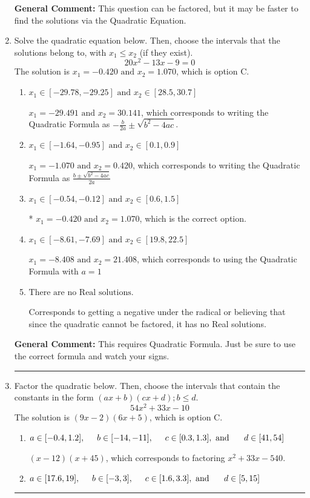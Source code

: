 \documentclass{extbook}[14pt]
\newcommand{\litem}[1]{\item #1

\rule{\textwidth}{0.4pt}}
\begin{document}
\begin{enumerate}
{\textbf{General Comment:} This question can be factored, but it may be faster to find the solutions via the Quadratic Equation.
}
\litem{
Solve the quadratic equation below. Then, choose the intervals that the solutions belong to, with $x_1 \leq x_2$ (if they exist).
\[ 20x^{2} -13 x -9 = 0 \]The solution is \( x_1 = -0.420 \text{ and } x_2 = 1.070 \), which is option C.\begin{enumerate}[label=\Alph*.]
\item \( x_1 \in [-29.78, -29.25] \text{ and } x_2 \in [28.5, 30.7] \)

 $x_1 = -29.491 \text{ and } x_2 = 30.141$, which corresponds to writing the Quadratic Formula as $-\frac{b}{2a} \pm \sqrt{b^2 - 4ac}$.
\item \( x_1 \in [-1.64, -0.95] \text{ and } x_2 \in [0.1, 0.9] \)

 $x_1 = -1.070 \text{ and } x_2 = 0.420$, which corresponds to writing the Quadratic Formula as $\frac{b \pm \sqrt{b^2 - 4ac}}{2a}$
\item \( x_1 \in [-0.54, -0.12] \text{ and } x_2 \in [0.6, 1.5] \)

* $x_1 = -0.420 \text{ and } x_2 = 1.070$, which is the correct option.
\item \( x_1 \in [-8.61, -7.69] \text{ and } x_2 \in [19.8, 22.5] \)

 $x_1 = -8.408 \text{ and } x_2 = 21.408$, which corresponds to using the Quadratic Formula with $a=1$
\item \( \text{There are no Real solutions.} \)

Corresponds to getting a negative under the radical or believing that since the quadratic cannot be factored, it has no Real solutions.
\end{enumerate}

\textbf{General Comment:} This requires Quadratic Formula. Just be sure to use the correct formula and watch your signs.
}
\litem{
Factor the quadratic below. Then, choose the intervals that contain the constants in the form $(ax+b)(cx+d); b \leq d.$
\[ 54x^{2} +33 x -10 \]The solution is \( (9x -2)(6x + 5) \), which is option C.\begin{enumerate}[label=\Alph*.]
\item \( a \in [-0.4, 1.2], \hspace*{5mm} b \in [-14, -11], \hspace*{5mm} c \in [0.3, 1.3], \text{ and } \hspace*{5mm} d \in [41, 54] \)

 $(x -12)(x + 45)$, which corresponds to factoring $x^{2} +33 x -540$.
\item \( a \in [17.6, 19], \hspace*{5mm} b \in [-3, 3], \hspace*{5mm} c \in [1.6, 3.3], \text{ and } \hspace*{5mm} d \in [5, 15] \)


\end{enumerate}}
\end{enumerate}
\end{document}
